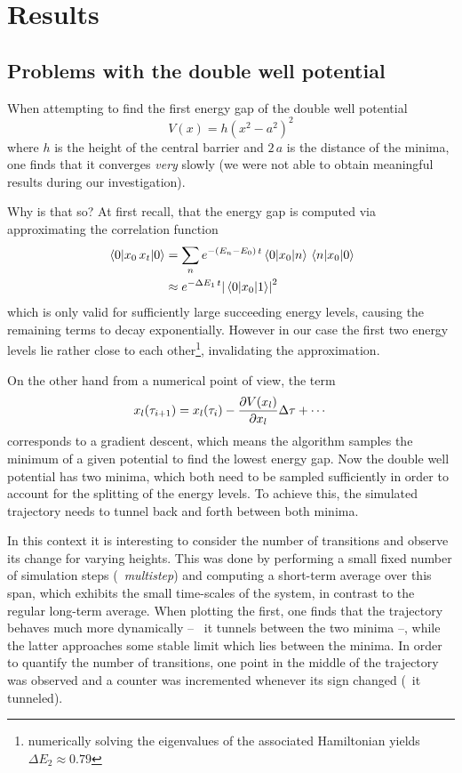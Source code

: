 \section{Results}
\subsection{Problems with the double well potential}
When attempting to find the first energy gap of the double well potential
\begin{equation}
    V(x)=h\left(x^2-a^2\right)^2
    \label{eq:double-well}
\end{equation}
where $h$ is the height of the central barrier and $2\,a$ is the distance of the
minima, one finds that it converges \emph{very} slowly (we were not able to
obtain meaningful results during our investigation).

Why is that so? At first recall, that the energy gap is computed via
approximating the correlation function
\begin{align*}
    \ev{x_0\,x_t}{0}&=\sum_{n}e^{-(E_n-E_0)\,t}\mel{0}{x_0}{n}\mel{n}{x_0}{0}
    \\&\approx{e^{-\Delta{E_1}\,t}}\abs{\mel{0}{x_0}{1}}^2
\end{align*}
which is only valid for sufficiently large succeeding energy levels, causing
the remaining terms to decay exponentially. However in our case the first two
energy levels lie rather close to each other\footnote{numerically solving the
eigenvalues of the associated Hamiltonian yields $\Delta{E_2}\approx0.79$},
invalidating the approximation.

On the other hand from a numerical point of view, the term
\begin{equation*}
    x_l(\tau_{i+1})=x_l(\tau_i)-\pdv{V(x_l)}{x_l}\Delta\tau+\dotsb
\end{equation*}
corresponds to a gradient descent, which means the algorithm samples the
minimum of a given potential to find the lowest energy gap. Now the double well
potential has two minima, which both need to be sampled sufficiently in order
to account for the splitting of the energy levels. To achieve this, the
simulated trajectory needs to tunnel back and forth between both minima.

In this context it is interesting to consider the number of transitions and
observe its change for varying heights. This was done by performing a small
fixed number of simulation steps (\textrightarrow~\emph{multistep}) and computing a short-term
average over this span, which exhibits the small time-scales of the system, in
contrast to the regular long-term average. When plotting the first, one finds
that the trajectory behaves much more dynamically -- \eg~it tunnels between the
two minima --, while the latter approaches some stable limit which lies between
the minima. In order to quantify the number of transitions, one point in the
middle of the trajectory was observed and a counter was incremented whenever
its sign changed (\ie~it tunneled).

